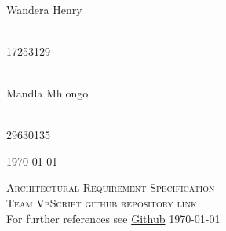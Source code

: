 \documentclass[a4paper,12pt]{report}
\begin{document}
\begin{titlepage}
\begin{center}
		\begin{minipage}{0.4\textwidth}
			\begin{flushleft} \large
				\emph{} \\
				Wandera {Henry}
			\end{flushleft}
		\end{minipage}
		\begin{minipage}{0.4\textwidth}
			\begin{flushright} \large
				\emph{} \\
				17253129
			\end{flushright}
		\end{minipage}

		\begin{minipage}{0.4\textwidth}
			\begin{flushleft} \large
				\emph{} \\
				Mandla {Mhlongo}
			\end{flushleft}
		\end{minipage}
		\begin{minipage}{0.4\textwidth}
			\begin{flushright} \large
				\emph{} \\
				29630135
			\end{flushright}
		\end{minipage}
\vfill

{\large \today}
\end{center}
\end{titlepage}
\footnotesize
\normalsize

\renewcommand{\thesection}{\arabic{section}}

\begin{center}
\tableofcontents
\footnotesize
\normalsize  
\end{center}

\renewcommand{\thesection}{\arabic{section}}
\newpage
\begin{center}
	\textsc{\LARGE Architectural Requirement Specification}\\[1.5cm]
	\textsc{\Large Team VbScript github repository link}\\[0.5cm]
	For further references see \href{https://github.com/mfanamasimula/VBScript}{Github}
	\today
\end{center}
\newpage
\end{document}
